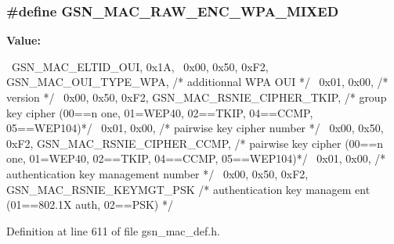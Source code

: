 \hypertarget{a00522_a319b13288dfda86c84aca64c53e237be}{
\subsubsection[{GSN\_\-MAC\_\-RAW\_\-ENC\_\-WPA\_\-MIXED}]{\setlength{\rightskip}{0pt plus 5cm}\#define GSN\_\-MAC\_\-RAW\_\-ENC\_\-WPA\_\-MIXED}}
\label{a00522_a319b13288dfda86c84aca64c53e237be}
{\bfseries Value:}
\begin{DoxyCode}
{{                                                                               
              \
    GSN_MAC_ELTID_OUI, 0x1A,                                                     
                \
    0x00, 0x50, 0xF2, GSN_MAC_OUI_TYPE_WPA,         /* additionnal WPA OUI       
                                                    */ \
    0x01, 0x00,                                 /* version                       
                                                */ \
    0x00, 0x50, 0xF2, GSN_MAC_RSNIE_CIPHER_TKIP,    /* group key cipher    (00==n
      one, 01=WEP40, 02==TKIP, 04==CCMP, 05==WEP104)*/ \
    0x01, 0x00,                                 /* pairwise key cipher number    
                                                */ \
    0x00, 0x50, 0xF2, GSN_MAC_RSNIE_CIPHER_CCMP,    /* pairwise key cipher (00==n
      one, 01=WEP40, 02==TKIP, 04==CCMP, 05==WEP104)*/ \
    0x01, 0x00,                                 /* authentication key management 
      number                                    */ \
    0x00, 0x50, 0xF2, GSN_MAC_RSNIE_KEYMGT_PSK      /* authentication key managem
      ent (01==802.1X auth, 02==PSK)                */ \
}}
\end{DoxyCode}


Definition at line 611 of file gsn\_\-mac\_\-def.h.


